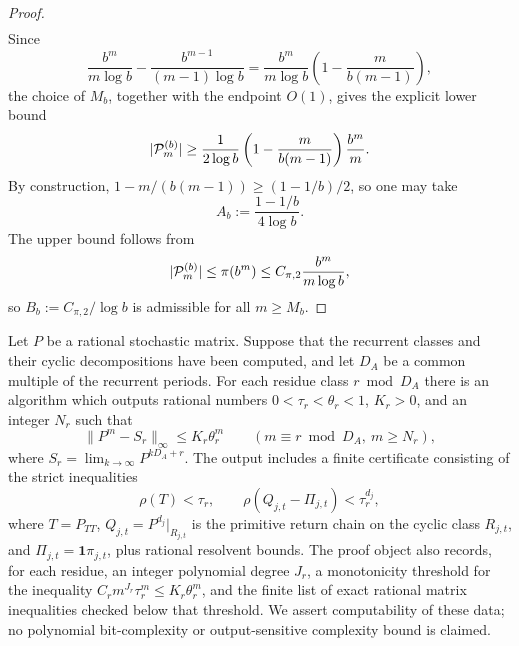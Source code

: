 \begin{proof}
\[\begin{aligned}
    \end{aligned}
  \]
  Since
  \[
    \frac{b^m}{m\log b}
    -\frac{b^{m-1}}{(m-1)\log b}
    =
    \frac{b^m}{m\log b}
    \left(1-\frac{m}{b(m-1)}\right),
  \]
  the choice of \(M_b\), together with the endpoint \(O(1)\), gives the
  explicit lower bound
  \[
    \lvert \mathcal P_m^{(b)} \rvert
    \ge
    \frac{1}{2\log b}
    \left(1-\frac{m}{b(m-1)}\right)\frac{b^m}{m}.
  \]
  By construction,
  \(1-m/(b(m-1))\ge (1-1/b)/2\), so one may take
  \[
    A_b:=\frac{1-1/b}{4\log b}.
  \]
  The upper bound follows from
  \[
    \lvert \mathcal P_m^{(b)} \rvert\le\pi(b^m)
      \le C_{\pi,2}\frac{b^m}{m\log b},
  \]
  so \(B_b:=C_{\pi,2}/\log b\) is admissible for all \(m\ge M_b\).
\end{proof}

\begin{lemma}
  \label{lem:effective-spectral-constants}
  Let \(P\) be a rational stochastic matrix. Suppose that the recurrent
  classes and their cyclic decompositions have been computed, and let
  \(D_A\) be a common multiple of the recurrent periods. For each
  residue class \(r\bmod D_A\) there is an algorithm which outputs
  rational numbers \(0<\tau_r<\theta_r<1\), \(K_r>0\), and an integer
  \(N_r\) such that
  \[
    \|P^m-S_r\|_\infty\le K_r\theta_r^m
    \qquad(m\equiv r\bmod D_A,\ m\ge N_r),
  \]
  where \(S_r=\lim_{k\to\infty}P^{kD_A+r}\). The output includes a
  finite certificate consisting of the strict inequalities
  \[
    \rho(T)<\tau_r,\qquad
    \rho(Q_{j,t}-\Pi_{j,t})<\tau_r^{d_j},
  \]
  where \(T=P_{TT}\), \(Q_{j,t}=P^{d_j}|_{R_{j,t}}\) is the primitive
  return chain on the cyclic class \(R_{j,t}\), and
  \(\Pi_{j,t}=\mathbf 1\pi_{j,t}\), plus rational resolvent bounds. The
  proof object also records, for each residue, an integer polynomial
  degree \(J_r\), a monotonicity threshold for the inequality
  \(C_rm^{J_r}\tau_r^m\le K_r\theta_r^m\), and the finite list of exact
  rational matrix inequalities checked below that threshold. We assert
  computability of these data; no polynomial bit-complexity or
  output-sensitive complexity bound is claimed.
\end{lemma}

